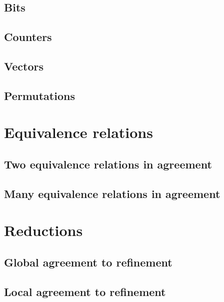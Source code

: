 \documentclass{scrbook}
\begin{document}
\section{Bits}


\section{Counters}


\section{Vectors}


\section{Permutations}


\chapter{Equivalence relations}\label{ch:equivalences}


\section{Two equivalence relations in agreement}


\section{Many equivalence relations in agreement}



\chapter{Reductions}\label{ch:reductions}


\section{Global agreement to refinement}


\section{Local agreement to refinement}

\end{document}
